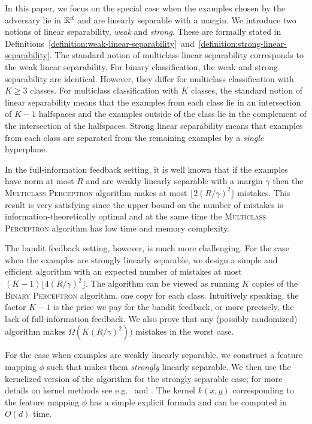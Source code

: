 In this paper, we focus on the special case when the examples chosen by the
adversary lie in $\mathbb{R}^d$ and are linearly separable with a margin. We introduce
two notions of linear separability, \emph{weak} and \emph{strong}. These are
formally stated in
Definitions~\ref{definition:weak-linear-separability}~and~\ref{definition:strong-linear-separability}.
The standard notion of multiclass linear separability corresponds to the weak
linear separability. For binary classification, the weak and strong separability
are identical. However, they differ for multiclass classification with $K \ge 3$
classes. For multiclass classification with $K$ classes, the standard notion of
linear separability means that the examples from each class lie in an
intersection of $K-1$ halfspaces and the examples outside of the class lie in
the complement of the intersection of the halfspaces. Strong linear separability
means that examples from each class are separated from the remaining examples by
a \emph{single} hyperplane.

In the full-information feedback setting, it is well known that if the examples
have norm at most $R$ and are weakly linearly separable with a margin $\gamma$
then the \textsc{Multiclass Perceptron} algorithm makes at most $\lfloor
2(R/\gamma)^2 \rfloor$ mistakes. This result is very satisfying since the upper
bound on the number of mistakes is information-theoretically optimal and at the
same time the \textsc{Multiclass Perceptron} algorithm has low time and memory
complexity.

The bandit feedback setting, however, is much more challenging. For the case
when the examples are strongly linearly separable, we design a simple and
efficient algorithm with an expected number of mistakes at most $(K-1) \lfloor
4(R/\gamma)^2 \rfloor$. The algorithm can be viewed as running $K$ copies of the
\textsc{Binary Perceptron} algorithm, one copy for each class. Intuitively
speaking, the factor $K-1$ is the price we pay for the bandit feedback, or more
precisely, the lack of full-information feedback. We also prove that any
(possibly randomized) algorithm makes $\Omega(K (R/\gamma)^2))$ mistakes in the
worst case.

For the case when examples are weakly linearly separable, we construct a feature
mapping $\phi$ such that makes them \emph{strongly} linearly separable. We then
use the kernelized version of the algorithm for the strongly separable case; for
more details on kernel methods see e.g.~\citet{Scholkopf-Smola-2002} and
\citet{Shawe-Taylor-Cristianini-2004}. The kernel $k(x,y)$ corresponding to the
feature mapping $\phi$ has a simple explicit formula and can be computed in
$O(d)$ time.

